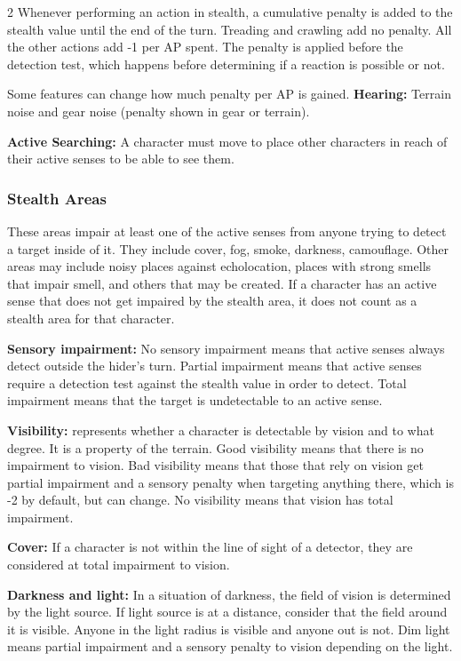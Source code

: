 \begin{multicols}{2}
Whenever performing an action in stealth, a cumulative penalty is added to the stealth value until the end of the turn. Treading and crawling add no penalty. All the other actions add -1 per AP spent.  The penalty is applied before the detection test, which happens before determining if a reaction is possible or not.

Some features can change how much penalty per AP is gained. \textbf{Hearing:} Terrain noise and gear noise (penalty shown in gear or terrain).

\textbf{Active Searching:} A character must move to place other characters in reach of their active senses to be able to see them.


\subsubsection{Stealth Areas}

These areas impair at least one of the active senses from anyone trying to detect a target inside of it. They include cover, fog, smoke, darkness, camouflage. Other areas may include noisy places against echolocation, places with strong smells that impair smell, and others that may be created. If a character has an active sense that does not get impaired by the stealth area, it does not count as a stealth area for that character.

\textbf{Sensory impairment:} No sensory impairment means that active senses always detect outside the hider's turn. Partial impairment means that active senses require a detection test against the stealth value in order to detect. Total impairment means that the target is undetectable to an active sense.

\textbf{Visibility:} represents whether a character is detectable by vision and to what degree. It is a property of the terrain. Good visibility means that there is no impairment to vision. Bad visibility means that those that rely on vision get partial impairment and a sensory penalty when targeting anything there, which is -2 by default, but can change. No visibility means that vision has total impairment. 

\textbf{Cover:} If a character is not within the line of sight of a detector, they are considered at total impairment to vision. 

\textbf{Darkness and light:} In a situation of darkness, the field of vision is determined by the light source. If light source is at a distance, consider that the field around it is visible. Anyone in the light radius is visible and anyone out is not. Dim light means partial impairment and a sensory penalty to vision depending on the light.


\end{multicols}

